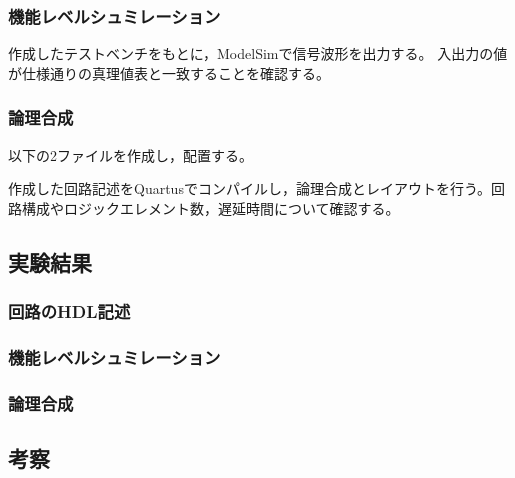 \subsubsection{機能レベルシュミレーション}
作成したテストベンチをもとに，ModelSimで信号波形を出力する。
入出力の値が仕様通りの真理値表と一致することを確認する。

\subsubsection{論理合成}
以下の2ファイルを作成し，配置する。



作成した回路記述をQuartusでコンパイルし，論理合成とレイアウトを行う。回路構成やロジックエレメント数，遅延時間について確認する。

\subsection{実験結果}
\subsubsection{回路のHDL記述}
\subsubsection{機能レベルシュミレーション}
\subsubsection{論理合成}
\subsection{考察}
